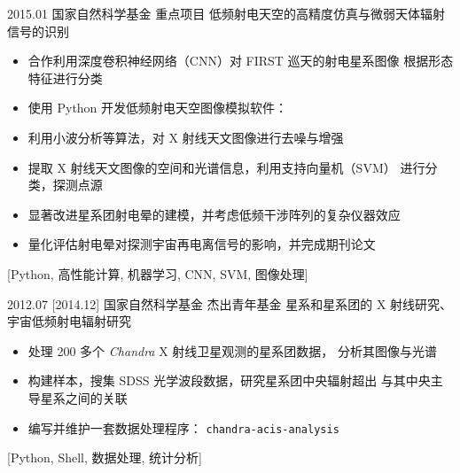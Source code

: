 \documentclass[zh]{resume}
\begin{document}
\begin{projects}
  \project
    {2015.01}%
    {国家自然科学基金}%
    {重点项目}%
    {低频射电天空的高精度仿真与微弱天体辐射信号的识别}%
    {\begin{itemize}
      \item 合作利用深度卷积神经网络（CNN）对 FIRST 巡天的射电星系图像
            根据形态特征进行分类
      \item 使用 Python 开发低频射电天空图像模拟软件：
      \item 利用小波分析等算法，对 X 射线天文图像进行去噪与增强
      \item 提取 X 射线天文图像的空间和光谱信息，利用支持向量机（SVM）
            进行分类，探测点源
      \item 显著改进星系团射电晕的建模，并考虑低频干涉阵列的复杂仪器效应
      \item 量化评估射电晕对探测宇宙再电离信号的影响，并完成期刊论文
    \end{itemize}}%
    [Python, 高性能计算, 机器学习, CNN, SVM, 图像处理]

  \separator{0.7em}
  \project
    {2012.07}%
    [2014.12]%
    {国家自然科学基金}%
    {杰出青年基金}%
    {星系和星系团的 X 射线研究、宇宙低频射电辐射研究}%
    {\begin{itemize}
      \item 处理 200 多个 \textit{Chandra} X 射线卫星观测的星系团数据，
            分析其图像与光谱
      \item 构建样本，搜集 SDSS 光学波段数据，研究星系团中央辐射超出
            与其中央主导星系之间的关联
      \item 编写并维护一套数据处理程序：
              {\texttt{chandra-acis-analysis}}
    \end{itemize}}%
    [Python, Shell, 数据处理, 统计分析]
\end{projects}
\end{document}
